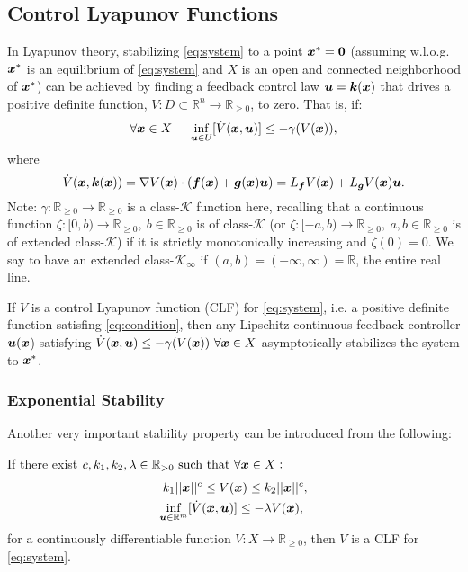 \subsection{Control Lyapunov Functions}
In Lyapunov theory, stabilizing \eqref{eq:system} to a point $\boldsymbol{x}^*=\boldsymbol{0}$ (assuming w.l.o.g.
$\boldsymbol{x}^*$ is an equilibrium of \eqref{eq:system} and 
$X$ is an open and connected neighborhood of $\boldsymbol{x}^*$) can be achieved by finding a feedback control law $\boldsymbol{u}=\boldsymbol{k}(\boldsymbol{x})$ that drives a positive definite function, $V: D \subset \mathbb{R}^n \to \mathbb{R}_{\geq 0}$, to zero. That is, if:
\begin{equation}
    \forall \boldsymbol{x}\in X ~~~~ \inf_{\boldsymbol{u}\in U}[\dot{V}(\boldsymbol{x},\boldsymbol{u})] \leq -\gamma(V(\boldsymbol{x})),
\label{eq:condition}
\end{equation}
where
\begin{equation}
    \dot{V}(\boldsymbol{x},\boldsymbol{k}(\boldsymbol{x})) = \nabla V(\boldsymbol{x})\cdot(\boldsymbol{f}(\boldsymbol{x})+\boldsymbol{g}(\boldsymbol{x})\boldsymbol{u})= L_{\boldsymbol{f}}V(\boldsymbol{x})+L_{\boldsymbol{g}}V(\boldsymbol{x})\boldsymbol{u}.
\label{eq:vdot}
\end{equation}
Note: $\gamma : \mathbb{R}_{\geq 0} \to \mathbb{R}_{\geq 0} $ is a class-$\mathcal{K}$ function here, 
recalling that a continuous function $\zeta : [0, b) \to \mathbb{R}_{\geq 0},~b \in \mathbb{R}_{\geq 0}$ is of class-$\mathcal{K}$ (or $\zeta : [-a, b) \to \mathbb{R}_{\geq 0},~a,b \in \mathbb{R}_{\geq 0}$ is of extended class-$\mathcal{K}$) if it is strictly monotonically increasing and $\zeta(0) = 0$. We say to have an extended class-$\mathcal{K}_\infty$ if $(a,b) = (-\infty, \infty) = \mathbb{R}$, the entire real line.
\begin{theorem}\label{th:clft}
If $V$ is a control Lyapunov function (CLF) for \eqref{eq:system}, i.e. a positive definite function satisfing \eqref{eq:condition}, then any Lipschitz continuous feedback controller $\boldsymbol{u}(\boldsymbol{x}$) satisfying $\dot{V}(\boldsymbol{x},\boldsymbol{u}) \leq -\gamma(V(\boldsymbol{x}))~\forall \boldsymbol{x}\in X$ asymptotically stabilizes the system to $\boldsymbol{x}^*$.
\end{theorem}
\subsubsection{Exponential Stability}
Another very important stability property can be introduced from the following:
\begin{definition}
If there exist $c,k_1,k_2,\lambda \in \mathbb{R}_{> 0} \text{~such that~} \forall \boldsymbol{x} \in X:$ 
\begin{equation}
    \begin{split}
    k_1||\boldsymbol{x}||^c \leq V(\boldsymbol{x}) \leq k_2||\boldsymbol{x}||^c,  \\
    \inf_{{\boldsymbol{u}\in \mathbb{R}^m}}[\dot{V}(\boldsymbol{x},\boldsymbol{u})] \leq -\lambda V(\boldsymbol{x}),~
    \end{split}
    \label{eq:expstabcond}
\end{equation}
for a continuously differentiable function $V : X \to \mathbb{R}_{\geq 0}$, then $V$ is a CLF for \eqref{eq:system}.
\label{def:expclf}
\end{definition}

